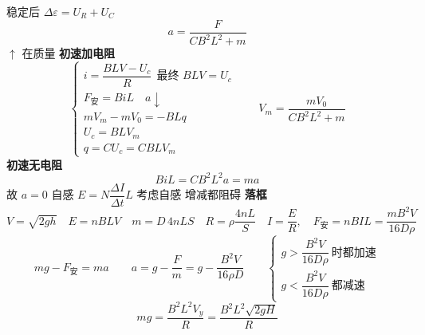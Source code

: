 稳定后 $\Delta\varepsilon=U_R+U_C$
\[ a=\frac{F}{CB^2L^2+m} \]
$\uparrow$ 在质量
\textbf{初速加电阻} %
\[ \left\{\begin{array}{l}
i=\dfrac{BLV-U_c}{R}\ \ \text{最终 }BLV=U_c\\[2.5ex]
F_{\text{安}}=BiL\quad a\downarrow\\[1ex]
mV_m-mV_0=-BLq\\[1ex]
U_c=BLV_m\\[1ex]
q=CU_c=CBLV_m
\end{array}\right.\qquad V_m=\frac{mV_0}{CB^2L^2+m} \]
\textbf{初速无电阻} %
\[ BiL=CB^2L^2a=ma \]
故 $a=0$
自感 $E=N\dfrac{\Delta I}{\Delta t}L$ %
考虑自感
增减都阻碍
\textbf{落框}
\[ V=\sqrt{2gh}\quad E=nBLV\quad m=D\,4nLS\quad R=\rho\frac{4nL}{S}\quad I=\frac{E}{R},\quad F_{\text{安}}=nBIL=\frac{mB^2V}{16D\rho} \]
\[ mg-F_{\text{安}}=ma\qquad a=g-\frac{F}{m}=g-\frac{B^2V}{16\rho D}\qquad \left\{\begin{array}{l} g>\dfrac{B^2V}{16D\rho}\ \text{时都加速}\\[2ex] g<\dfrac{B^2V}{16D\rho}\ \text{都减速}\end{array}\right. \] %
\[ mg=\frac{B^2L^2V_y}{R}=\frac{B^2L^2\sqrt{2gH}}{R} \]
